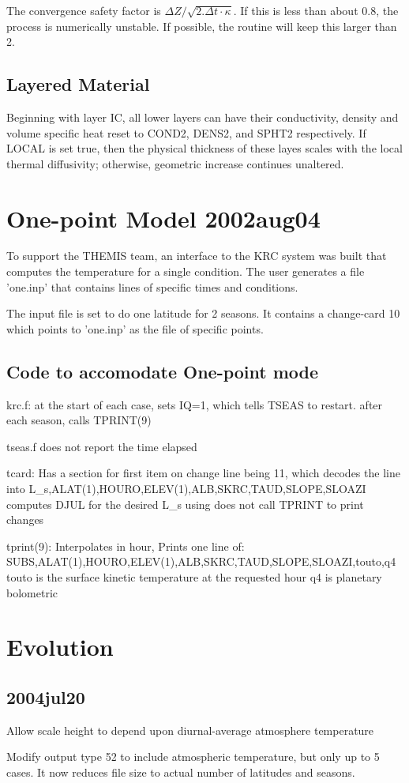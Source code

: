 \documentclass{article}
\begin{document}
The convergence safety factor is $\Delta Z / \sqrt{ 2. \Delta t \cdot
  \kappa}$. If this is less than about 0.8, the process is numerically
unstable. If possible, the routine will keep this larger than 2.

\subsection{Layered Material}
 Beginning with layer IC, all lower layers can have their conductivity, density
 and volume specific heat reset to COND2, DENS2, and SPHT2 respectively. If
 LOCAL is set true, then the physical thickness of these layes scales with the
 local thermal diffusivity; otherwise, geometric increase continues unaltered.

\section{One-point Model 2002aug04}
To support the THEMIS team, an interface to the KRC system was built that
computes the temperature for a single condition. The user generates a file
'one.inp' that contains lines of specific times and conditions.

The input file  is set to do one latitude for 2 seasons.
It contains a change-card 10 which points to 'one.inp' as the file of specific
points.

\subsection{Code to accomodate One-point mode}
krc.f: 
\qi at the start of each case, sets IQ=1, which tells TSEAS to restart.
\qi after each season, calls TPRINT(9)

tseas.f
\qi does not report the time elapsed

tcard:
\qi Has a section for first item on change line being 11, which decodes the line into
\qii L\_s,ALAT(1),HOURO,ELEV(1),ALB,SKRC,TAUD,SLOPE,SLOAZI
\qii computes DJUL for the desired L\_s using 
\qi does not call TPRINT to print changes

tprint(9):
\qi Interpolates in hour,  Prints one line of: 
\qii SUBS,ALAT(1),HOURO,ELEV(1),ALB,SKRC,TAUD,SLOPE,SLOAZI,touto,q4
\qiii touto is the surface kinetic temperature at the requested hour
\qiii q4 is planetary bolometric 

\section{Evolution}
\subsection{2004jul20} 
Allow scale height to depend upon diurnal-average atmosphere temperature

Modify output type 52 to include atmospheric temperature, but only up to 5
cases. It now reduces file size to actual number of latitudes and seasons.
\end{document}

